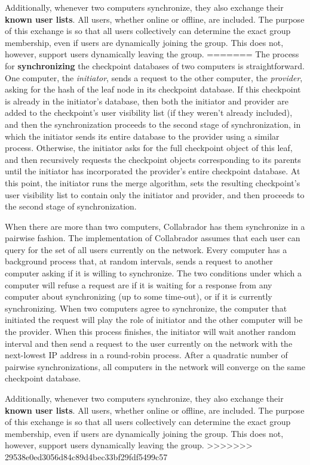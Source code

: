 \documentclass[11pt,titlepage]{article}
\begin{document}
Additionally, whenever two computers synchronize, they also exchange their \textbf{known user lists}. All users, whether online or offline, are included. The purpose of this exchange is so that all users collectively can determine the exact group membership, even if users are dynamically joining the group. This does not, however, support users dynamically leaving the group.
=======
The process for \textbf{synchronizing} the checkpoint databases of two
computers is straightforward. One computer, the \emph{initiator},
sends a request to the other computer, the \emph{provider}, asking for
the hash of the leaf node in its checkpoint database. If this
checkpoint is already in the initiator's database, then both the
initiator and provider are added to the checkpoint's user visibility
list (if they weren't already included), and then the synchronization
proceeds to the second stage of synchronization, in which the
initiator sends its entire database to the provider using a similar
process. Otherwise, the initiator asks for the full checkpoint object
of this leaf, and then recursively requests the checkpoint objects
corresponding to its parents until the initiator has incorporated the
provider's entire checkpoint database. At this point, the initiator
runs the merge algorithm, sets the resulting checkpoint's user
visibility list to contain only the initiator and provider, and then
proceeds to the second stage of synchronization.

When there are more than two computers, Collabrador has them
synchronize in a pairwise fashion. The implementation of Collabrador
assumes that each user can query for the set of all users currently on
the network. Every computer has a background process that, at random
intervals, sends a request to another computer asking if it is willing
to synchronize. The two conditions under which a computer will refuse
a request are if it is waiting for a response from any computer about
synchronizing (up to some time-out), or if it is currently
synchronizing. When two computers agree to synchronize, the computer
that initiated the request will play the role of initiator and the
other computer will be the provider. When this process finishes, the
initiator will wait another random interval and then send a request to
the user currently on the network with the next-lowest IP address in a
round-robin process. After a quadratic number of pairwise
synchronizations, all computers in the network will converge on the
same checkpoint database.

Additionally, whenever two computers synchronize, they also exchange
their \textbf{known user lists}. All users, whether online or offline,
are included. The purpose of this exchange is so that all users
collectively can determine the exact group membership, even if users
are dynamically joining the group. This does not, however, support
users dynamically leaving the group.
>>>>>>> 29538e0ed3056d84c89d4bec33bf29fdf5499c57
\end{document}
